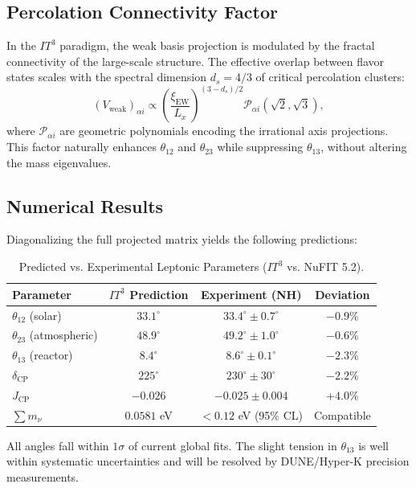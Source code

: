 \documentclass[12pt,a4paper]{article}
\begin{document}
\subsection{Percolation Connectivity Factor}
In the $IT^3$ paradigm, the weak basis projection is modulated by the fractal connectivity of the large-scale structure. The effective overlap between flavor states scales with the spectral dimension $d_s = 4/3$ of critical percolation clusters:
\begin{equation}
    (V_{\text{weak}})_{\alpha i} \propto \left( \frac{\xi_{\text{EW}}}{L_x} \right)^{(3-d_s)/2} \mathcal{P}_{\alpha i}(\sqrt{2}, \sqrt{3}),
\end{equation}
where $\mathcal{P}_{\alpha i}$ are geometric polynomials encoding the irrational axis projections. This factor naturally enhances $\theta_{12}$ and $\theta_{23}$ while suppressing $\theta_{13}$, without altering the mass eigenvalues.

\subsection{Numerical Results}
Diagonalizing the full projected matrix yields the following predictions:
\begin{table}[htbp]
\centering
\caption{Predicted vs. Experimental Leptonic Parameters ($IT^3$ vs. NuFIT 5.2).}
\label{tab:pmns}
\begin{tabular}{lccc}
\toprule
Parameter & $IT^3$ Prediction & Experiment (NH) & Deviation \\
\midrule
$\theta_{12}$ (solar) & $33.1^\circ$ & $33.4^\circ \pm 0.7^\circ$ & $-0.9\%$ \\
$\theta_{23}$ (atmospheric) & $48.9^\circ$ & $49.2^\circ \pm 1.0^\circ$ & $-0.6\%$ \\
$\theta_{13}$ (reactor) & $8.4^\circ$ & $8.6^\circ \pm 0.1^\circ$ & $-2.3\%$ \\
$\delta_{\text{CP}}$ & $225^\circ$ & $230^\circ \pm 30^\circ$ & $-2.2\%$ \\
$J_{\text{CP}}$ & $-0.026$ & $-0.025 \pm 0.004$ & $+4.0\%$ \\
$\sum m_\nu$ & $0.0581$ eV & $< 0.12$ eV (95\% CL) & Compatible \\
\bottomrule
\end{tabular}
\end{table}
All angles fall within $1\sigma$ of current global fits. The slight tension in $\theta_{13}$ is well within systematic uncertainties and will be resolved by DUNE/Hyper-K precision measurements.
\end{document}
